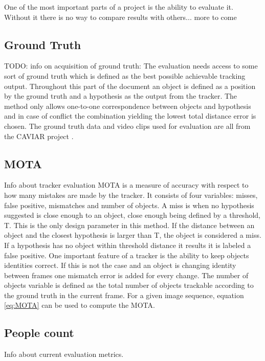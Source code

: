 One of the most important parts of a project is the ability to evaluate it. Without it there is no way to compare results with others... more to come

\subsection{Ground Truth}
TODO: info on acquisition of ground truth:
The evaluation needs access to some sort of ground truth which is defined as the best possible achievable tracking output. Throughout this part of the document an object is defined as a position by the ground truth and a hypothesis as the output from the tracker. The method only allows one-to-one correspondence between objects and hypothesis and in case of conflict the combination yielding the lowest total distance error is chosen. The ground truth data and video clips used for evaluation are all from the CAVIAR project \cite{CAVIAR}.

\subsection{MOTA}
Info about tracker evaluation
MOTA is a measure of accuracy with respect to how many mistakes are made by the tracker. It consists of four variables: misses, false positive, mismatches and number of objects. A miss is when no hypothesis suggested is close enough to an object, close enough being defined by a threshold, T. This is the only design parameter in this method. If the distance between an object and the closest hypothesis is larger than T, the object is considered a miss. If a hypothesis has no object within threshold distance it results it is labeled a false positive. One important feature of a tracker is the ability to keep objects identities correct. If this is not the case and an object is changing identity between frames one mismatch error is added for every change. The number of objects variable is defined as the total number of objects trackable according to the ground truth in the current frame. For a given image sequence, equation \eqref{eq:MOTA} can be used to compute the MOTA.

\subsection{People count}
Info about current evaluation metrics.